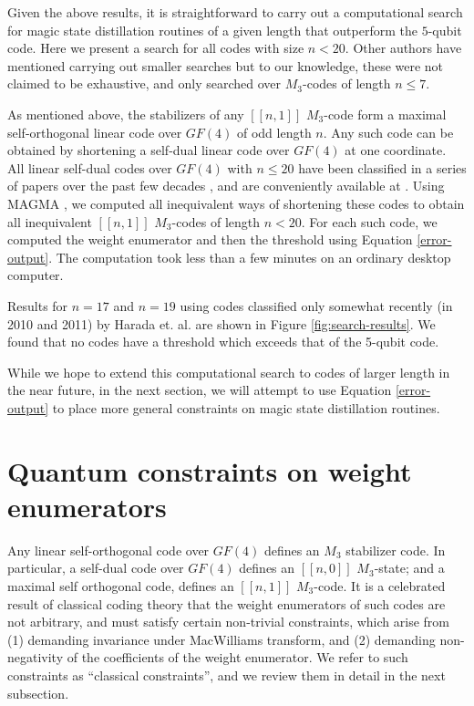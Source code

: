 \documentclass[11pt]{article}
\begin{document}
Given the above results, it is straightforward to carry out a computational search for magic state distillation routines of a given length that outperform the $5$-qubit code. Here we present a search for all codes with size $n<20$. Other authors have mentioned carrying out smaller searches \cite{MSD, reichardt2005quantum} but to our knowledge, these were not claimed to be exhaustive, and \cite{rall2017signed} only searched over $M_3$-codes of length $n \leq 7$.


As mentioned above, the stabilizers of any $[[n,1]]$ $M_3$-code form a maximal self-orthogonal linear code over $GF(4)$ of odd length $n$. Any such code can be obtained by shortening a self-dual linear code over $GF(4)$ at one coordinate. All linear self-dual codes over $GF(4)$ with $n \leq 20$ have been classified in a series of papers over the past few decades \cite{macwilliams1978self, Conway1979, harada2010classification, harada2011classification}, and are conveniently available at \cite{munemasa_codes_website}. Using MAGMA \cite{magma}, we computed all inequivalent ways of shortening these codes to obtain all inequivalent $[[n,1]]$ $M_3$-codes of length $n<20$. For each such code, we computed the weight enumerator and then the threshold using Equation \eqref{error-output}. { The computation took less than a few minutes on an ordinary desktop computer.}

Results for $n=17$ and $n=19$ using codes classified only somewhat recently (in 2010 and 2011) by Harada et. al.  \cite{harada2010classification, harada2011classification} are shown in Figure \ref{fig:search-results}. We found that no codes have a threshold which exceeds that of the 5-qubit code. 



While we hope to extend this computational search to codes of larger length in the near future, in the next section, we will attempt to use Equation \eqref{error-output} to place more general constraints on magic state distillation routines. 



\section{Quantum constraints on weight enumerators}
\label{sec:constraints}

Any linear self-orthogonal code over $GF(4)$ defines an $M_3$ stabilizer code. In particular, a self-dual code over $GF(4)$ defines an $[[n,0]]$ $M_3$-state; and a maximal self orthogonal code, defines an $[[n,1]]$ $M_3$-code. It is a celebrated result of classical coding theory that the weight enumerators of such codes are not arbitrary, and must satisfy certain non-trivial constraints, which arise from (1) demanding invariance under MacWilliams transform, and (2) demanding non-negativity of the coefficients of the weight enumerator. We refer to such constraints as ``classical constraints'', and we review them in detail in the next subsection.  
\end{document}
